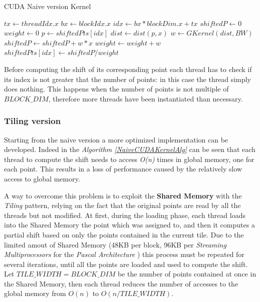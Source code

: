 \documentclass[10pt,twocolumn,letterpaper]{article}
\begin{document}
\begin{algorithm}
\caption{CUDA Naive version Kernel }
\label{NaiveCUDAKernelAlg}
\begin{algorithmic}
	\State $tx \gets threadIdx.x$
	\State $bx \gets blockIdx.x$
	\State $idx \gets bx * blockDim.x + tx$
	\State $shiftedP \gets 0$
	\State $weight \gets 0$
	\State $p \gets shiftedPts[idx]$
    		\State$dist \gets dist(p, x)$
    		\State $w \gets GKernel(dist, BW)$
    		\State $shiftedP\gets shiftedP + w*x$
    		\State $weight \gets weight + w$
    \EndFor
    \State $shiftedPts[idx] \gets shiftedP/weight$
    \EndIf
\EndFunction
\end{algorithmic}
\end{algorithm}

Before computing the shift of its corresponding point each thread has to check if its index is not greater that the number of points: in this case the thread simply does nothing. This happens when the number of points is not multiple of $BLOCK\_DIM$, therefore more threads have been instantiated than necessary.


\subsubsection{Tiling version}
Starting from the naive version a more optimized implementation can be developed. Indeed in the \emph{Algorithm \ref{NaiveCUDAKernelAlg}} can be seen that each thread to compute the shift needs to access \emph{O(n)} times in global memory, one for each point. This results in a loss of performance caused by the relatively slow access to global memory.
 
A way to overcome this problem is to exploit the \textbf{Shared Memory} with the \emph{Tiling} pattern, relying on the fact that the original points are read by all the threads but not modified. At first, during the loading phase, each thread loads into the Shared Memory the point which was assigned to, and then it computes a partial shift based on only the points contained in the current tile. Due to the limited amout of Shared Memory (48KB per block, 96KB per \emph{Streaming Multiprocessors} for the \emph{Pascal Architecture} \cite{Pascal}) this process must be repeated for several iterations, until all the points are loaded and used to compute the shift. Let $TILE\_WIDTH = BLOCK\_DIM$ be the number of points contained at once in the Shared Memory, then each thread reduces the number of accesses to the global memory from $O(n)$ to $O(n/TILE\_WIDTH)$.
\end{document}
